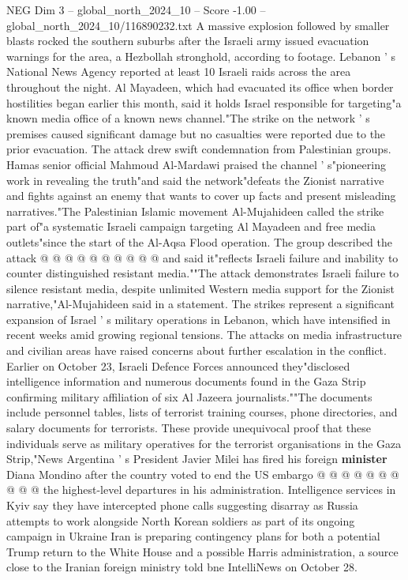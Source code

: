 \begin{textsample}{NEG Dim 3 – global\_north\_2024\_10 – Score -1.00 – global\_north\_2024\_10/116890232.txt}  \label{ex:f3_neg_335}
A massive explosion followed by smaller blasts rocked the southern suburbs after the Israeli army issued evacuation warnings for the area, a Hezbollah stronghold, according to footage.
Lebanon ' s National News Agency reported at least 10 Israeli raids across the area throughout the night.
Al Mayadeen, which had evacuated its office when border hostilities began earlier this month, said it holds Israel responsible for targeting"a known media office of a known news channel."The strike on the network ' s premises caused significant damage but no casualties were reported due to the prior evacuation.
The attack drew swift condemnation from Palestinian groups.
Hamas senior official Mahmoud Al-Mardawi praised the channel ' s"pioneering work in revealing the truth"and said the network"defeats the Zionist narrative and fights against an enemy that wants to cover up facts and present misleading narratives."The Palestinian Islamic movement Al-Mujahideen called the strike part of"a systematic Israeli campaign targeting Al Mayadeen and free media outlets"since the start of the Al-Aqsa Flood operation.
The group described the attack @ @ @ @ @ @ @ @ @ @ and said it"reflects Israeli failure and inability to counter distinguished resistant media.""The attack demonstrates Israeli failure to silence resistant media, despite unlimited Western media support for the Zionist narrative,"Al-Mujahideen said in a statement.
The strikes represent a significant expansion of Israel ' s military operations in Lebanon, which have intensified in recent weeks amid growing regional tensions.
The attacks on media infrastructure and civilian areas have raised concerns about further escalation in the conflict.
Earlier on October 23, Israeli Defence Forces announced they"disclosed intelligence information and numerous documents found in the Gaza Strip confirming military affiliation of six Al Jazeera journalists.""The documents include personnel tables, lists of terrorist training courses, phone directories, and salary documents for terrorists.
These provide unequivocal proof that these individuals serve as military operatives for the terrorist organisations in the Gaza Strip,"News Argentina ' s President Javier Milei has fired his foreign \textbf{minister} Diana Mondino after the country voted to end the US embargo @ @ @ @ @ @ @ @ @ @ the highest-level departures in his administration.
Intelligence services in Kyiv say they have intercepted phone calls suggesting disarray as Russia attempts to work alongside North Korean soldiers as part of its ongoing campaign in Ukraine Iran is preparing contingency plans for both a potential Trump return to the White House and a possible Harris administration, a source close to the Iranian foreign ministry told bne IntelliNews on October 28.

\end{textsample}
